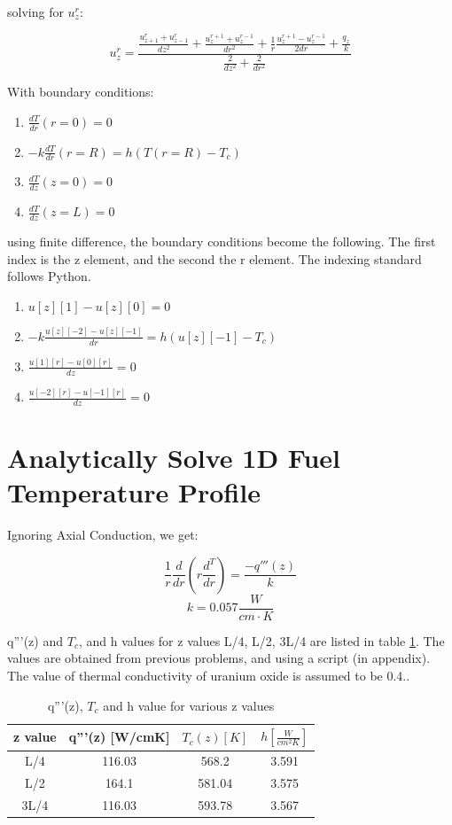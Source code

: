 \documentclass[12pt,letterpaper]{article}
\begin{document}
solving for $u_z^r$:

\[ u_z^r = \frac{\frac{u_{z+1}^r + u_{z-1}^r}{dz^2} + \frac{u^{r+1}_z + u^{r-1}_z}{dr^2}
  + \frac{1}{r} \frac{u^{r+1}_z - u^{r-1}_z}{2dr} + \frac{q_z}{k}}{\frac{2}{dz^2} + \frac{2}{dr^2}} \]

With boundary conditions:

\begin{enumerate}
    \item $\frac{dT}{dr}(r=0) = 0$
    \item $-k \frac{dT}{dr} (r=R) = h(T(r=R) - T_c)$
    \item $\frac{dT}{dz}(z=0) = 0 $
    \item $\frac{dT}{dz}(z=L) = 0 $
\end{enumerate}

using finite difference, the boundary conditions become the following.
The first index is the z element, and the second the r element. The indexing
standard follows Python.
\begin{enumerate}
    \item $u[z][1]-u[z][0] = 0$
    \item $-k \frac{u[z][-2]-u[z][-1]}{dr} = h(u[z][-1] - T_c)$
    \item $ \frac{u[1][r] - u[0][r]}{dz} = 0$
    \item $\frac{u[-2][r] - u[-1][r]}{dz} = 0 $
\end{enumerate}




\section*{Analytically Solve 1D Fuel Temperature Profile}
Ignoring Axial Conduction, we get:

\[\frac{1}{r} \frac{d}{dr} (r \frac{d^T}{dr}) = \frac{-q'''(z)}{k}\]
\[k = 0.057 \frac{W}{cm\cdot K}\]

q'''(z) and $T_c$, and h  values for z values L/4, L/2, 3L/4 are listed in table \ref{tab:q_vol}.
The values are obtained from previous problems, and using a script (in appendix).
The value of thermal conductivity of uranium oxide is assumed
to be 0.4.\cite{ronchi_thermal_1999}.

\begin{table}[h]
     \centering
    \begin{tabular}{cccc}
       \hline
       z value & q'''(z) [W/cmK] & $T_c(z) [K]$ & $h [\frac{W}{cm^2 K}] $ \\
       \hline
       L/4 & 116.03 & 568.2 & 3.591 \\
       L/2 & 164.1 & 581.04 & 3.575 \\
       3L/4 & 116.03 & 593.78 & 3.567 \\
       \hline
    \end{tabular}
    \caption {q'''(z), $T_c$ and h value for various z values}
    \label{tab:q_vol}
\end{table}
\end{document}
